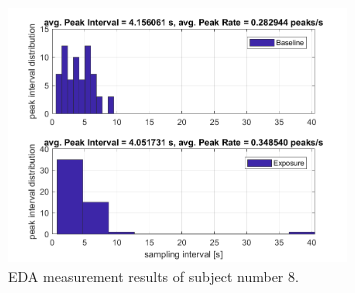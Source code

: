 \begin{figure}[H]
\centering
\includegraphics[width=0.8\textwidth]{images/8EDA.png}
\caption{EDA measurement results of subject number 8.}
\label{EDAtabImg}
\end{figure}